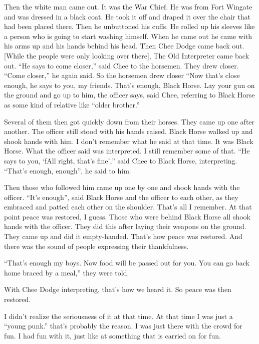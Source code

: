 Then the white man came out. It was the War Chief. He was from Fort Wingate and was dressed in a black coat. He took it off and draped it over the chair that had been placed there. Then he unbuttoned his cuffs. He rolled up his sleeves like a person who is going to start washing himself. When he came out he came with his arms up and his hands behind his head. Then Chee Dodge came back out. [While the people were only looking over there], The Old Interpreter came back out. ``He says to come closer,'' said Chee to the horsemen. They drew closer. ``Come closer,'' he again said. So the horsemen drew closer ``Now that's close enough, he says to you, my friends. That's enough, Black Horse. Lay your gun on the ground and go up to him, the officer says, said Chee, referring to Black Horse as some kind of relative like ``older brother.''

Several of them then got quickly down from their horses. They came up one after another. The officer still stood with his hands raised. Black Horse walked up and shook hands with him. I don't remember what he said at that time. It was Black Horse. What the officer said was interpreted. I still remember some of that. ``He says to you, `fAll right, that's fine','' said Chee to Black Horse, interpreting. ``That's enough, enough'', he said to him.

Then those who followed him came up one by one and shook hands with the officer. ``It's enough'', said Black Horse and the officer to each other, as they embraced and patted each other on the shoulder.
That's all I remember. At that point peace was restored, I guess. Those who were behind Black Horse all shook hands with the officer. They did this after laying their weapons on the ground. They came up and did it empty-handed. That's how peace was restored. And there was the sound of people expressing their thankfulness.

``That's enough my boys. Now food will be passed out for you. You can go back home braced by a meal,'' they were told.

With Chee Dodge interpreting, that's how we heard it. So peace was then restored.

I didn't realize the seriousness of it at that time. At that time I was just a ``young punk.'' that's probably the reason. I was just there with the crowd for fun. I had fun with it, just like at something that is carried on for fun.